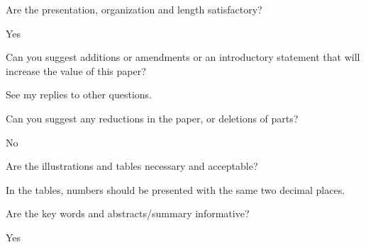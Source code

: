 \documentclass[notitlepage,12pt]{article}
\begin{document}
    \begin{revcomment}{Are the presentation, organization and length satisfactory?}


    Yes
    \end{revcomment}

    \begin{revcomment}{Can you suggest additions or amendments or an introductory statement that will increase the value of this paper?}

    See my replies to other questions.
    \end{revcomment}

    \begin{revcomment}{Can you suggest any reductions in the paper, or deletions of parts?}

    No
    \end{revcomment}

    \begin{revcomment}{Are the illustrations and tables necessary and acceptable?}

    In the tables, numbers should be presented with the same two decimal places.
    \end{revcomment}

    \begin{revcomment}{Are the key words and abstracts/summary informative?}

    Yes
    \end{revcomment}
\end{document}
